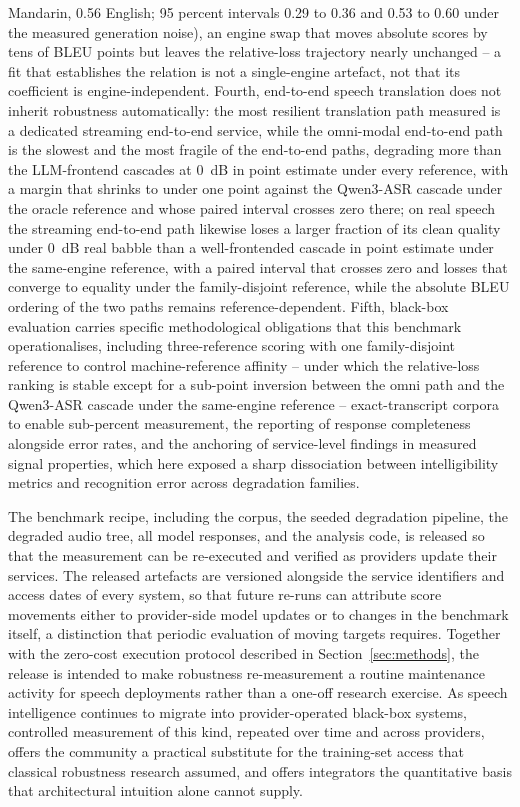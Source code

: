 Mandarin, 0.56 English; 95 percent intervals 0.29 to 0.36 and 0.53 to
0.60 under the measured generation noise), an engine swap that moves
absolute scores
by tens of BLEU points but leaves the relative-loss trajectory nearly
unchanged -- a fit that establishes the relation is not a single-engine
artefact, not that its coefficient is engine-independent. Fourth,
end-to-end speech translation does not inherit
robustness automatically: the most resilient translation path measured is a
dedicated streaming end-to-end service, while the omni-modal end-to-end
path is the slowest and the most fragile of the end-to-end paths, degrading
more than the LLM-frontend cascades at 0~dB in point estimate under every
reference, with a margin that shrinks to under one point against the
Qwen3-ASR cascade under the oracle reference and whose paired interval
crosses zero there; on real speech the streaming end-to-end path
likewise
loses a larger fraction of its clean quality under 0~dB real babble than a
well-frontended cascade in point estimate under the same-engine
reference, with a paired interval that crosses zero and losses that
converge to equality under the family-disjoint reference, while the
absolute BLEU ordering of the two paths
remains reference-dependent. Fifth,
black-box evaluation carries specific methodological obligations that this
benchmark operationalises, including three-reference scoring with one
family-disjoint reference to control machine-reference affinity -- under
which the relative-loss ranking is stable except for a sub-point inversion
between the omni path and the Qwen3-ASR cascade under the same-engine
reference -- exact-transcript corpora to enable sub-percent
measurement, the reporting of response completeness alongside error rates,
and the anchoring of service-level findings in measured signal properties,
which here exposed a sharp dissociation between intelligibility metrics and
recognition error across degradation families.

The benchmark recipe, including the corpus, the seeded degradation pipeline,
the degraded audio tree, all model responses, and the analysis code, is
released so that the measurement can be re-executed and verified as
providers update their services. The released artefacts are versioned alongside the service
identifiers and access dates of every system, so that future re-runs can
attribute score movements either to provider-side model updates or to
changes in the benchmark itself, a distinction that periodic evaluation of
moving targets requires. Together with the zero-cost execution protocol
described in Section~\ref{sec:methods}, the release is intended to make
robustness re-measurement a routine maintenance activity for speech
deployments rather than a one-off research exercise. As
speech intelligence continues to migrate into provider-operated black-box
systems, controlled measurement of this kind, repeated over time and across
providers, offers the community a practical substitute for the training-set
access that classical robustness research assumed, and offers integrators
the quantitative basis that architectural intuition alone cannot supply.
